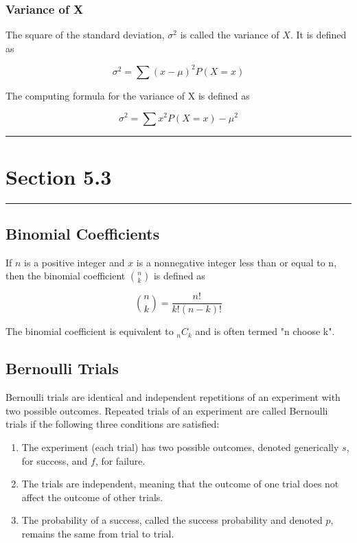 \documentclass[12pt]{article}
\begin{document}
            \subsubsection*{Variance of X}
                The square of the standard deviation, $\sigma^2$ is called the variance of $X$. It is defined
                as 
                \begin{center}
                    \[
                        \sigma^2 = \sum (x - \mu)^2 P(X = x)    
                    \]
                \end{center}
                The computing formula for the variance of X is defined as
                \begin{center}
                    \[
                        \sigma^2 = \sum x^2 P(X = x) - \mu^2   
                    \]
                \end{center}

    \noindent\rule{\textwidth}{0.4pt}
    \section*{Section 5.3}
    \noindent\rule{\textwidth}{0.4pt}
        \subsection*{Binomial Coefficients}
            If $n$ is a positive integer and $x$ is a nonnegative integer less than or equal to n, then the
            binomial coefficient ${n \choose k}$ is defined as
            \begin{center}
                \[
                    {n \choose k} = \frac{n!}{k!(n-k)!}    
                \]             
            \end{center}
            The binomial coefficient is equivalent to $_nC_k$ and is often termed "n choose k".
        \subsection*{Bernoulli Trials}
            Bernoulli trials are identical and independent repetitions of an experiment with two possible
            outcomes. Repeated trials of an experiment are called Bernoulli trials if the following three 
            conditions are satisfied:
            \begin{enumerate}
                \item The experiment (each trial) has two possible outcomes, denoted generically $s$, for
                success, and $f$, for failure.
                \item The trials are independent, meaning that the outcome of one trial does not affect the
                outcome of other trials.
                \item The probability of a success, called the success probability and denoted $p$, remains
                the same from trial to trial.
            \end{enumerate}
\end{document}
